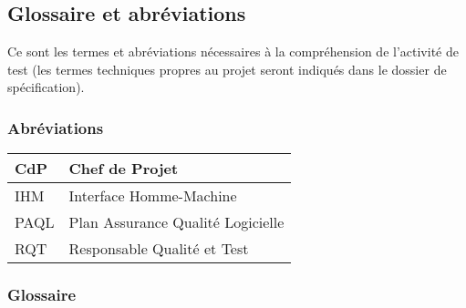 \subsection{Glossaire et abréviations}
\label{sec:intro:termes}

Ce sont les termes et abréviations nécessaires à la compréhension de l'activité de test (les termes techniques propres au projet seront indiqués dans le dossier de spécification).

\subsubsection{Abréviations}

\noindent\begin{longtable}[c]{|p{}|p{}|}
\hline
CdP & Chef de Projet\\
\hline
IHM & Interface Homme-Machine\\
\hline
PAQL & Plan Assurance Qualité Logicielle\\
\hline
RQT & Responsable Qualité et Test\\
\hline
\end{longtable}

\subsubsection{Glossaire}

